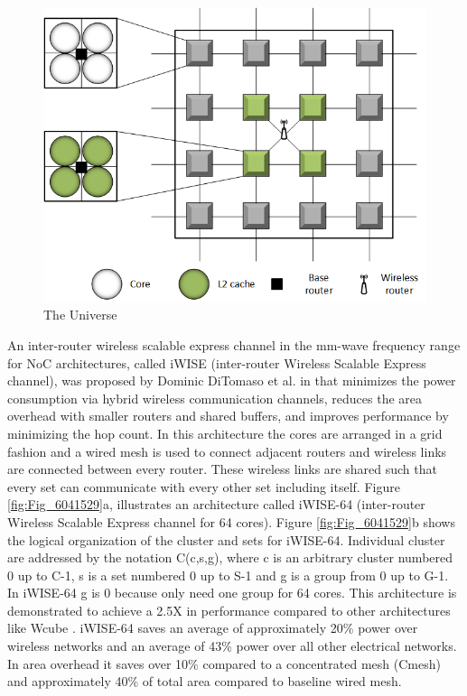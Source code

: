 \documentclass[12pt]{article}
\begin{document}
\begin{figure}[ht]
\centering
\includegraphics[scale=0.5]{Fig_lee2009scalable.png}
\caption{The Universe}
\label{fig:Fig_lee2009scalable}
\end{figure}

An inter-router wireless scalable express channel in the mm-wave frequency range for NoC architectures, called iWISE (inter-router Wireless Scalable Express channel), was proposed by Dominic DiTomaso et al. in \citep{6041529} that minimizes the power consumption via hybrid wireless communication channels, reduces the area overhead with smaller routers and shared buffers, and improves performance by minimizing the hop count. In this architecture the cores are arranged in a grid fashion and a wired mesh is used to connect adjacent routers and wireless links are connected between every router. These wireless links are shared such that every set can communicate with every other set including itself. Figure \ref{fig:Fig_6041529}a, illustrates an architecture called iWISE-64 (inter-router Wireless Scalable Express channel for 64 cores). Figure \ref{fig:Fig_6041529}b shows the logical organization of the cluster and sets for iWISE-64. Individual cluster are addressed by the notation C(c,s,g), where c is an arbitrary cluster numbered 0 up to C-1, s is a set numbered 0 up to S-1 and g is a group from 0 up to G-1. In iWISE-64 g is 0 because only need one group for 64 cores. This architecture is demonstrated to achieve a 2.5X in performance compared to other architectures like Wcube \citep{lee2009scalable}. iWISE-64 saves an average of approximately 20\% power over wireless networks and an average of 43\% power over all other electrical networks. In area overhead it saves over 10\% compared to a concentrated mesh (Cmesh) and approximately 40\% of total area compared to baseline wired mesh.
\end{document}
